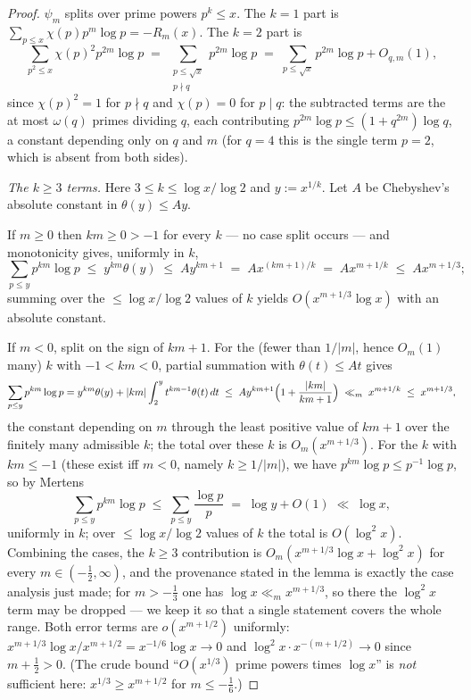 \documentclass[11pt]{article}
\begin{document}
\begin{proof}
$\psi_m$ splits over prime powers $p^k\le x$. The $k=1$ part is
$\sum_{p\le x}\chi(p)p^m\log p=-R_m(x)$. The $k=2$ part is
\[
\sum_{p^2\le x}\chi(p)^2p^{2m}\log p
\;=\;\sum_{\substack{p\le\sqrt x\\ p\nmid q}}p^{2m}\log p
\;=\;\sum_{p\le\sqrt x}p^{2m}\log p+O_{q,m}(1),
\]
since $\chi(p)^2=1$ for $p\nmid q$ and $\chi(p)=0$ for $p\mid q$: the
subtracted terms are the at most $\omega(q)$ primes dividing $q$, each
contributing $p^{2m}\log p\le(1+q^{2m})\log q$, a constant depending
only on $q$ and $m$ (for $q=4$ this is the single term $p=2$, which is
absent from both sides).

\emph{The $k\ge3$ terms.} Here $3\le k\le\log x/\log2$ and
$y:=x^{1/k}$. Let $A$ be Chebyshev's absolute constant in
$\theta(y)\le Ay$.

If $m\ge0$ then $km\ge0>-1$ for every $k$ --- no case split occurs ---
and monotonicity gives, uniformly in $k$,
\[
\sum_{p\le y}p^{km}\log p\;\le\;y^{km}\theta(y)\;\le\;Ay^{km+1}
\;=\;Ax^{(km+1)/k}\;=\;Ax^{m+1/k}\;\le\;Ax^{m+1/3};
\]
summing over the $\le\log x/\log2$ values of $k$ yields
$O(x^{m+1/3}\log x)$ with an absolute constant.

If $m<0$, split on the sign of $km+1$. For the (fewer than $1/|m|$,
hence $O_m(1)$ many) $k$ with $-1<km<0$, partial summation with
$\theta(t)\le At$ gives
\[
\sum_{p\le y}p^{km}\log p
=y^{km}\theta(y)+|km|\int_2^y t^{km-1}\theta(t)\,dt
\;\le\;Ay^{km+1}\Bigl(1+\frac{|km|}{km+1}\Bigr)
\;\ll_m\;x^{m+1/k}\;\le\;x^{m+1/3},
\]
the constant depending on $m$ through the least positive value of
$km+1$ over the finitely many admissible $k$; the total over these $k$
is $O_m(x^{m+1/3})$. For the $k$ with $km\le-1$ (these exist iff
$m<0$, namely $k\ge1/|m|$), we have $p^{km}\log p\le p^{-1}\log p$, so
by Mertens
\[
\sum_{p\le y}p^{km}\log p\;\le\;\sum_{p\le y}\frac{\log p}{p}
\;=\;\log y+O(1)\;\ll\;\log x ,
\]
uniformly in $k$; over $\le\log x/\log2$ values of $k$ the total is
$O(\log^2x)$. Combining the cases, the $k\ge3$ contribution is
$O_m(x^{m+1/3}\log x+\log^2x)$ for every $m\in(-\tfrac12,\infty)$, and
the provenance stated in the lemma is exactly the case analysis just
made; for $m>-\tfrac13$ one has $\log x\ll_m x^{m+1/3}$, so there the
$\log^2x$ term may be dropped --- we keep it so that a single statement
covers the whole range. Both error terms are $o(x^{m+1/2})$ uniformly:
$x^{m+1/3}\log x/x^{m+1/2}=x^{-1/6}\log x\to0$ and
$\log^2x\cdot x^{-(m+1/2)}\to0$ since $m+\tfrac12>0$. (The crude bound
``$O(x^{1/3})$ prime powers times $\log x$'' is \emph{not} sufficient
here: $x^{1/3}\ge x^{m+1/2}$ for $m\le-\tfrac16$.)


\end{proof}
\end{document}
